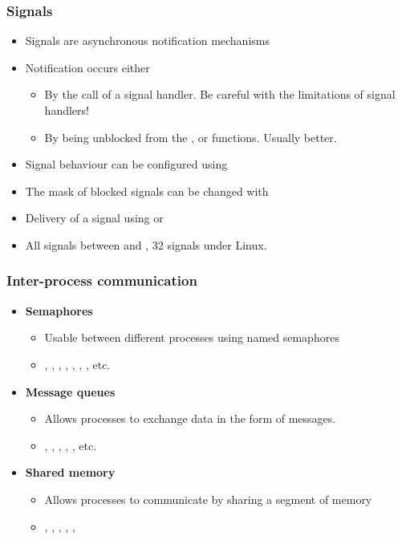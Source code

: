 \begin{frame}
  \frametitle{Signals}
  \begin{itemize}
  \item Signals are asynchronous notification mechanisms
  \item Notification occurs either
    \begin{itemize}
    \item By the call of a signal handler. Be careful with the limitations of signal
      handlers!
    \item By being unblocked from the ,
       or  functions. Usually
      better.
    \end{itemize}
  \item Signal behaviour can be configured using 
  \item The mask of blocked signals can be changed with
  \item Delivery of a signal using  or
  \item All signals between  and , 32
    signals under Linux.
  \end{itemize}
\end{frame}

\begin{frame}
  \frametitle{Inter-process communication}
  \begin{itemize}
  \item {\bf Semaphores}
    \begin{itemize}
    \item Usable between different processes using named semaphores
    \item {}, , ,
      , , ,
      , etc.
    \end{itemize}
  \item {\bf Message queues}
    \begin{itemize}
    \item Allows processes to exchange data in the form of messages.
    \item {}, , ,
      , , etc.
    \end{itemize}
  \item {\bf Shared memory}
    \begin{itemize}
    \item Allows processes to communicate by sharing a segment of
      memory
    \item {}, , ,
      , , 
    \end{itemize}
  \end{itemize}
\end{frame}


